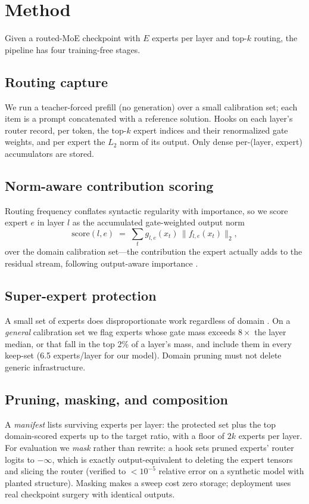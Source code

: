 \documentclass[11pt]{article}
\begin{document}
\section{Method}

Given a routed-MoE checkpoint with $E$ experts per layer and top-$k$ routing,
the pipeline has four training-free stages.

\subsection{Routing capture}
We run a teacher-forced prefill (no generation) over a small calibration set;
each item is a prompt concatenated with a reference solution. Hooks on each
layer's router record, per token, the top-$k$ expert indices and their
renormalized gate weights, and per expert the $L_2$ norm of its output. Only
dense per-(layer, expert) accumulators are stored.

\subsection{Norm-aware contribution scoring}
Routing frequency conflates syntactic regularity with importance, so we score
expert $e$ in layer $l$ as the accumulated gate-weighted output norm
\begin{equation}
\mathrm{score}(l,e) \;=\; \sum_{t} g_{l,e}(x_t)\,\bigl\lVert f_{l,e}(x_t)
\bigr\rVert_2 ,
\end{equation}
over the domain calibration set---the contribution the expert actually adds to
the residual stream, following output-aware importance \cite{easyep}.

\subsection{Super-expert protection}
A small set of experts does disproportionate work regardless of domain
\cite{illusion}. On a \emph{general} calibration set we flag experts whose gate
mass exceeds $8\times$ the layer median, or that fall in the top 2\% of a
layer's mass, and include them in every keep-set (6.5 experts/layer for our
model). Domain pruning must not delete generic infrastructure.

\subsection{Pruning, masking, and composition}
\label{sec:mask}
A \emph{manifest} lists surviving experts per layer: the protected set plus the
top domain-scored experts up to the target ratio, with a floor of $2k$ experts
per layer. For evaluation we \emph{mask} rather than rewrite: a hook sets
pruned experts' router logits to $-\infty$, which is exactly output-equivalent
to deleting the expert tensors and slicing the router (verified to
$<10^{-5}$ relative error on a synthetic model with planted structure). Masking
makes a sweep cost zero storage; deployment uses real checkpoint surgery with
identical outputs.
\end{document}
